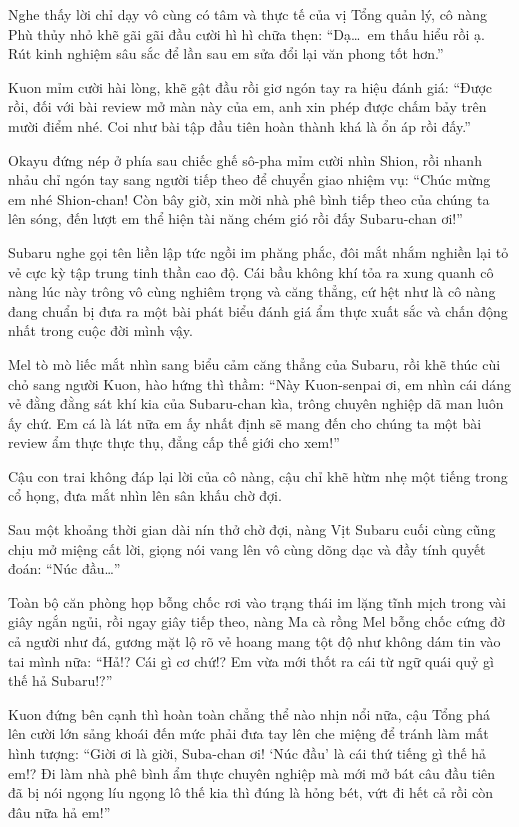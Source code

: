 \documentclass[../main.tex]{subfiles}
\begin{document}
Nghe thấy lời chỉ dạy vô cùng có tâm và thực tế của vị Tổng quản lý, cô nàng Phù thủy nhỏ khẽ gãi gãi đầu cười hì hì chữa thẹn: ``Dạ\dots\ em thấu hiểu rồi ạ. Rút kinh nghiệm sâu sắc để lần sau em sửa đổi lại văn phong tốt hơn.''

Kuon mỉm cười hài lòng, khẽ gật đầu rồi giơ ngón tay ra hiệu đánh giá: ``Được rồi, đối với bài review mở màn này của em, anh xin phép được chấm bảy trên mười điểm nhé. Coi như bài tập đầu tiên hoàn thành khá là ổn áp rồi đấy.''

Okayu đứng nép ở phía sau chiếc ghế sô-pha mỉm cười nhìn Shion, rồi nhanh nhảu chỉ ngón tay sang người tiếp theo để chuyển giao nhiệm vụ: ``Chúc mừng em nhé Shion-chan! Còn bây giờ, xin mời nhà phê bình tiếp theo của chúng ta lên sóng, đến lượt em thể hiện tài năng chém gió rồi đấy Subaru-chan ơi!''

Subaru nghe gọi tên liền lập tức ngồi im phăng phắc, đôi mắt nhắm nghiền lại tỏ vẻ cực kỳ tập trung tinh thần cao độ. Cái bầu không khí tỏa ra xung quanh cô nàng lúc này trông vô cùng nghiêm trọng và căng thẳng, cứ hệt như là cô nàng đang chuẩn bị đưa ra một bài phát biểu đánh giá ẩm thực xuất sắc và chấn động nhất trong cuộc đời mình vậy.


Mel tò mò liếc mắt nhìn sang biểu cảm căng thẳng của Subaru, rồi khẽ thúc cùi chỏ sang người Kuon, hào hứng thì thầm: ``Này Kuon-senpai ơi, em nhìn cái dáng vẻ đằng đằng sát khí kia của Subaru-chan kìa, trông chuyên nghiệp dã man luôn ấy chứ. Em cá là lát nữa em ấy nhất định sẽ mang đến cho chúng ta một bài review ẩm thực thực thụ, đẳng cấp thế giới cho xem!''

Cậu con trai không đáp lại lời của cô nàng, cậu chỉ khẽ hừm nhẹ một tiếng trong cổ họng, đưa mắt nhìn lên sân khấu chờ đợi.

Sau một khoảng thời gian dài nín thở chờ đợi, nàng Vịt Subaru cuối cùng cũng chịu mở miệng cất lời, giọng nói vang lên vô cùng dõng dạc và đầy tính quyết đoán: ``Núc đầu\dots''

Toàn bộ căn phòng họp bỗng chốc rơi vào trạng thái im lặng tĩnh mịch trong vài giây ngắn ngủi, rồi ngay giây tiếp theo, nàng Ma cà rồng Mel bỗng chốc cứng đờ cả người như đá, gương mặt lộ rõ vẻ hoang mang tột độ như không dám tin vào tai mình nữa: ``Hả!? Cái gì cơ chứ!? Em vừa mới thốt ra cái từ ngữ quái quỷ gì thế hả Subaru!?''

Kuon đứng bên cạnh thì hoàn toàn chẳng thể nào nhịn nổi nữa, cậu Tổng phá lên cười lớn sảng khoái đến mức phải đưa tay lên che miệng để tránh làm mất hình tượng: ``Giời ơi là giời, Suba-chan ơi! `Núc đầu' là cái thứ tiếng gì thế hả em!? Đi làm nhà phê bình ẩm thực chuyên nghiệp mà mới mở bát câu đầu tiên đã bị nói ngọng líu ngọng lô thế kia thì đúng là hỏng bét, vứt đi hết cả rồi còn đâu nữa hả em!''
\end{document}
